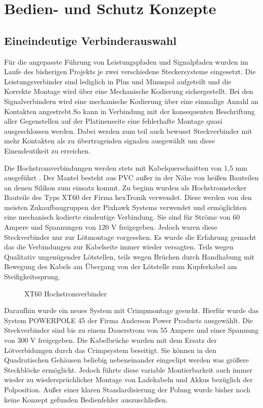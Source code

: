 \section{Bedien- und Schutz Konzepte}

\subsection{Eineindeutige Verbinderauswahl}

Für die angepasste Führung von Leistungspfaden und Signalpfaden wurden im Laufe des bisherigen Projekts je zwei verschiedene Steckersysteme eingesetzt.
Die Leistungsverbinder sind lediglich in Plus und Minuspol aufgeteilt und die Korrekte Montage wird über eine Mechanische Kodierung sichergestellt.
Bei den Signalverbindern wird eine mechanische Kodierung über eine einmalige Anzahl an Kontakten angestrebt.So kann in Verbindung mit der konsequenten Beschriftung aller Gegenstellen auf der Platinenseite eine fehlerhafte Montage quasi ausgeschlossen werden. Dabei werden zum teil auch bewusst Steckverbinder mit mehr Kontakten als zu übertragenden signalen ausgewählt um diese Einendeutikeit zu erreichen.

Die Hochstromverbindungen werden stets mit Kabelquerschnitten von 1,5 mm ausgeführt \cite{DIN_VDE_0298}. Der Mantel besteht aus PVC außer in der Nähe von heißen Bauteilen an denen Silikon zum einsatz kommt.
Zu beginn wurden als Hochstromstecker Bauteile des Typs XT60 der Firma hexTronik verwendet.
Diese werden von den meisten Zukaufbaugruppen der Pixhawk Systems verwendet und ermöglichten eine mechanisch kodierte eindeutige Verbindung.
Sie sind für Ströme von 60 Ampere und Spannungen von 120 V freigegeben.
Jedoch waren diese Steckverbinder nur zur Lötmontage vorgesehen. Es wurde die Erfahrung gemacht das die Verbindungen zur Kabelseite immer wieder versagten. Teils wegen Qualitativ ungenügender Lötstellen, teils wegen Brüchen durch Handhabung mit Bewegung des Kabels am Übergang von der Lötstelle zum Kupferkabel am Steifigkeitssprung.

\begin{figure}[H]
\centering
{}
\caption{XT60 Hochstromverbinder} 
\label{fig:XT60 Hochstromverbinder}
\end{figure}

Daraufhin wurde ein neues System mit Crimpmontage gesucht.
Hierfür wurde das System POWERPOLE 45 der Firma Anderson Power Products ausgewählt. Die Steckverbinder sind bis zu einem Dauerstrom von 55 Ampere und einer Spannung von 300 V freigegeben.
Die Kabelbrüche wurden mit dem Ersatz der Lötverbidungen durch das Crimpsystem beseitigt. Sie können in den Quadratischen Gehäusen beliebig nebeneinander eingeclipt werden was größere Steckblöcke ermöglicht. Jedoch führte diese variable Montierbarkeit auch immer wieder zu wiedersprüchlicher Montage von Ladekabeln und Akkus bezüglich der Polposition.
Außer einer klaren Standardisierung der Polung wurde bisher noch keine Konzept gefunden Bedienfehler auszuschließen. 

